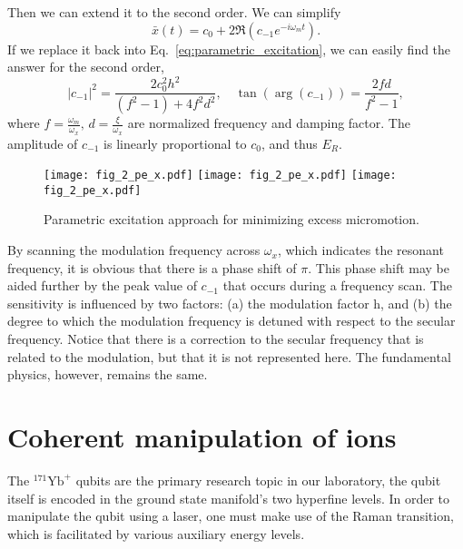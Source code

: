 Then we can extend it to the second order. We can simplify
\begin{equation}
    \bar{x}(t)=c_0+2 \Re\left(c_{-1} e^{-i \omega_m t}\right).
\end{equation}
If we replace it back into Eq.~\ref{eq:parametric_excitation}, we can easily find the answer for the second order,
\begin{equation}
    |c_{-1}|^2=\frac{2 c_0^2 h^2}{\left(f^2-1\right)+4 f^2 d^2}, \quad \tan \left(\arg \left(c_{-1}\right)\right)=\frac{2 f d}{f^2-1},
\end{equation}
where \(f=\frac{\omega_m}{\omega_x},\, d=\frac{\xi}{\omega_x}\) are normalized frequency and damping factor. The amplitude of \(c_{-1}\) is linearly proportional to \(c_0\), and thus \(E_R\).

\begin{figure}
    \centering
    {\texttt{[image: fig\_2\_pe\_x.pdf]}}
    {\texttt{[image: fig\_2\_pe\_x.pdf]}}
    {\texttt{[image: fig\_2\_pe\_x.pdf]}}
    \caption{Parametric excitation approach for minimizing excess micromotion.}
    \label{fig:fig_2_pe}
\end{figure}

By scanning the modulation frequency across \(\omega_x\), which indicates the resonant frequency, it is obvious that there is a phase shift of \(\pi\). This phase shift may be aided further by the peak value of \(c_{-1}\) that occurs during a frequency scan. The sensitivity is influenced by two factors: (a) the modulation factor h, and (b) the degree to which the modulation frequency is detuned with respect to the secular frequency. Notice that there is a correction to the secular frequency that is related to the modulation, but that it is not represented here. The fundamental physics, however, remains the same.



\section{Coherent manipulation of ions}

The ${ }^{171} \mathrm{Yb}^{+}$ qubits are the primary research topic in our laboratory, the qubit itself is encoded in the ground state manifold's two hyperfine levels. In order to manipulate the qubit using a laser, one must make use of the Raman transition, which is facilitated by various auxiliary energy levels.

